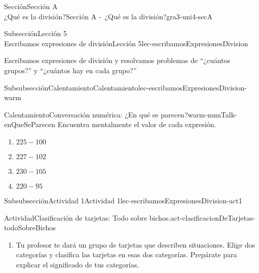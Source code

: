 \begin{sectionptx}{Sección}{{\Large Sección A\\}¿Qué es la división?}{}{Sección A -~¿Qué es la división?}{}{}{gra3-uni4-secA}
%
\begin{subsectionptx}{Subsección}{{\normalsize Lección 5\\[-0.05cm]}Escribamos expresiones de división}{}{Lección 5}{}{}{lec-escribamosExpresionesDivision}
\begin{introduction}{}%
Escribamos expresiones de división y resolvamos problemas de “¿cuántos grupos?” y “¿cuántos hay en cada grupo?”%
\end{introduction}%
%
%
\typeout{************************************************}
\typeout{************************************************}
%
\begin{subsubsectionptx}{Subsubsección}{Calentamiento}{}{Calentamiento}{}{}{lec-escribamosExpresionesDivision-warm}
\begin{exploration}{Calentamiento}{Conversación numérica: ¿En qué se parecen?}{warm-numTalk-enQueSeParecen}%
Encuentra mentalmente el valor de cada expresión.%
\par
%
\begin{enumerate}[label={\Alph*.}]
\item{}\(\displaystyle 225 - 100\)%
\item{}\(\displaystyle 227 - 102\)%
\item{}\(\displaystyle 230 - 105\)%
\item{}\(\displaystyle 220 - 95\)%
\end{enumerate}
%
\end{exploration}%
\end{subsubsectionptx}
%
%
\typeout{************************************************}
\typeout{************************************************}
%
\begin{subsubsectionptx}{Subsubsección}{Actividad 1}{}{Actividad 1}{}{}{lec-escribamosExpresionesDivision-act1}
\begin{activity}{Actividad}{Clasificación de tarjetas: Todo sobre bichos.}{act-clasificacionDeTarjetas-todoSobreBichos}%
%
\begin{enumerate}
\item{}Tu profesor te dará un grupo de tarjetas que describen situaciones. Elige dos categorías y clasifica las tarjetas en esas dos categorías. Prepárate para explicar el significado de tus categorías.%

\end{enumerate}
\end{activity}
\end{subsubsectionptx}
\end{subsectionptx}
\end{sectionptx}
